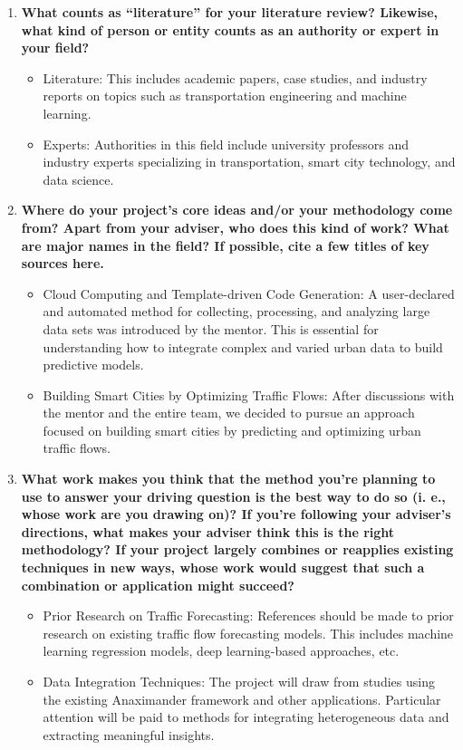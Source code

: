 \documentclass[12pt]{article}
\begin{document}
\begin{enumerate}
 
    \item \textbf{What counts as “literature” for your literature review? Likewise, what kind of person or entity counts as an authority or expert in your field?}

    \begin{itemize}
        \item Literature: This includes academic papers, case studies, and industry reports on topics such as transportation engineering and machine learning.
        \item Experts: Authorities in this field include university professors and industry experts specializing in transportation, smart city technology, and data science.
    \end{itemize}


 
    \item \textbf{Where do your project’s core ideas and/or your methodology come from? Apart from your adviser, who does this kind of work?  What are major names in the field?  If possible, cite a few titles of key sources here.}

\begin{itemize}
    \item Cloud Computing and Template-driven Code Generation: A user-declared and automated method for collecting, processing, and analyzing large data sets was introduced by the mentor. This is essential for understanding how to integrate complex and varied urban data to build predictive models.
    \item Building Smart Cities by Optimizing Traffic Flows: After discussions with the mentor and the entire team, we decided to pursue an approach focused on building smart cities by predicting and optimizing urban traffic flows.
\end{itemize}



    \item \textbf{What work makes you think that the method you’re planning to use to answer your driving question is the best way to do so (i. e., whose work are you drawing on)? If you’re following your adviser’s directions, what makes your adviser think this is the right methodology?  If your project largely combines or reapplies existing techniques in new ways, whose work would suggest that such a combination or application might succeed?}

\begin{itemize}
    \item Prior Research on Traffic Forecasting: References should be made to prior research on existing traffic flow forecasting models. This includes machine learning regression models, deep learning-based approaches, etc.
    \item Data Integration Techniques: The project will draw from studies using the existing Anaximander framework and other applications. Particular attention will be paid to methods for integrating heterogeneous data and extracting meaningful insights.
\end{itemize}





\end{enumerate}
\end{document}
